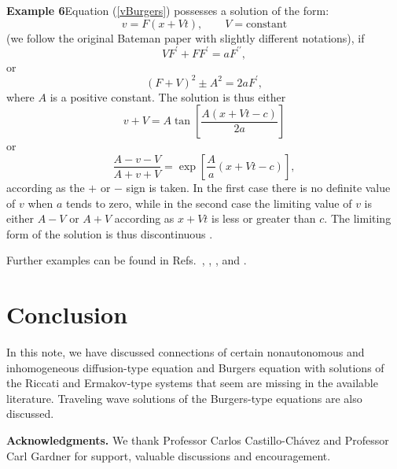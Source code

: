 \documentclass[12pt,reqno]{amsart}
\theoremstyle{plain}
\numberwithin{equation}{section}
\begin{document}
\textbf{Example 6\quad }Equation (\ref{vBurgers}) possesses a solution of
the form:\begin{equation}
v=F\left( x+Vt\right) ,\qquad V=\text{constant}
\end{equation}(we follow the original Bateman paper \cite{Bateman15} with slightly
different notations), if\begin{equation}
VF^{\prime }+FF^{\prime }=aF^{\prime \prime },
\end{equation}or\begin{equation}
\left( F+V\right) ^{2}\pm A^{2}=2aF^{\prime },
\end{equation}where $A$ is a positive constant. The solution is thus either\begin{equation}
v+V=A\tan \left[ \frac{A\left( x+Vt-c\right) }{2a}\right]
\end{equation}or\begin{equation}
\frac{A-v-V}{A+v+V}=\exp \left[ \frac{A}{a}\left( x+Vt-c\right) \right] ,
\end{equation}according as the $+$ or $-$ sign is taken. In the first case there is no
definite value of $v$ when $a$ tends to zero, while in the second case the
limiting value of $v$ is either $A-V$ or $A+V$ according as $x+Vt$ is less
or greater than $c.$ The limiting form of the solution is thus discontinuous 
\cite{Bateman15}.\medskip

Further examples can be found in Refs.~\cite{Craddock09}, \cite{Kudryash:Sine09}, \cite{Lop:Sus}, \cite{Miller77} and \cite{SuazoSusVega10}.

\section{Conclusion}

In this note, we have discussed connections of certain nonautonomous and
inhomogeneous diffusion-type equation and Burgers equation with solutions of
the Riccati and Ermakov-type systems that seem are missing in the available
literature. Traveling wave solutions of the Burgers-type equations are also
discussed.

\noindent \textbf{Acknowledgments.\/} We thank Professor Carlos Castillo-Ch\'{a}vez and Professor Carl Gardner for support, valuable discussions and
encouragement.
\end{document}

